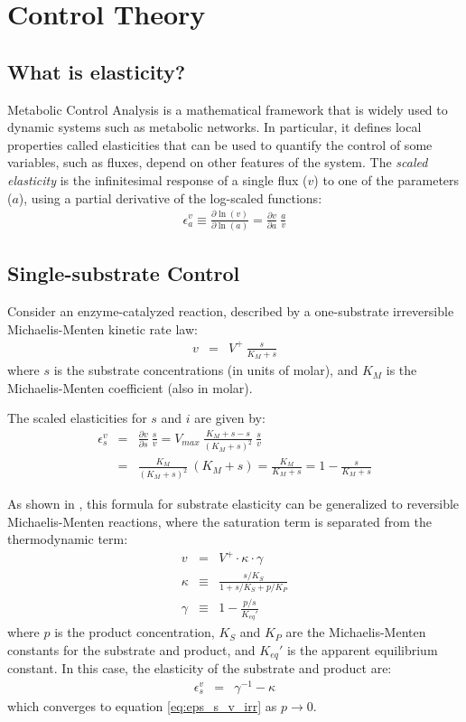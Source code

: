\documentclass[12pt,a4paper]{article}
\begin{document}
\section{Control Theory}
\subsection{What is elasticity?}
Metabolic Control Analysis \cite{Fell1996-be} is a mathematical framework that is widely used to dynamic systems such as metabolic networks. In particular, it defines local properties called elasticities that can be used to quantify the control of some variables, such as fluxes, depend on other features of the system. The \emph{scaled elasticity} is the infinitesimal response of a single flux ($v$) to one of the parameters ($a$), using a partial derivative of the log-scaled functions:
\begin{eqnarray}
    \epsilon_a^v \equiv \frac{\partial \ln(v)}{\partial \ln(a)} = \frac{\partial v}{\partial a} ~ \frac{a}{v}
\end{eqnarray}

\subsection{Single-substrate Control}
Consider an enzyme-catalyzed reaction, described by a one-substrate irreversible Michaelis-Menten kinetic rate law:
\begin{eqnarray}
    v &=& V^+ ~ \frac{s}{K_M + s}
\end{eqnarray}
where $s$ is the substrate concentrations (in units of molar), and $K_M$ is the Michaelis-Menten coefficient (also in molar).

The scaled elasticities for $s$ and $i$ are given by:
\begin{eqnarray}
    \epsilon_s^v &=& \frac{\partial v}{\partial s} ~ \frac{s}{v} = V_{max} ~ \frac{K_M + s - s}{(K_M + s)^2} ~ \frac{s}{v} \nonumber \\
    &=& \frac{K_M}{(K_M + s)^2} ~ (K_M + s) = \frac{K_M}{K_M + s} = 1 - \frac{s}{K_M + s}\label{eq:eps_s_v_irr}
\end{eqnarray}

As shown in \cite{Noor2013-vv}, this formula for substrate elasticity can be generalized to reversible Michaelis-Menten reactions, where the saturation term is separated from the thermodynamic term:
\begin{eqnarray}
    v &=& V^+ \cdot \kappa \cdot \gamma \\
    \kappa &\equiv& \frac{s/K_S}{1 + s/K_S + p/K_P} \\
    \gamma &\equiv& 1 - \frac{p/s}{K_{eq}'}
\end{eqnarray}
where $p$ is the product concentration, $K_S$ and $K_P$ are the Michaelis-Menten constants for the substrate and product, and $K_{eq}'$ is the apparent equilibrium constant. In this case, the elasticity of the substrate and product are:
\begin{eqnarray}
    \epsilon_s^v &=& \gamma^{-1} - \kappa
\end{eqnarray}
which converges to equation \ref{eq:eps_s_v_irr} as $p \rightarrow 0$.
\end{document}
